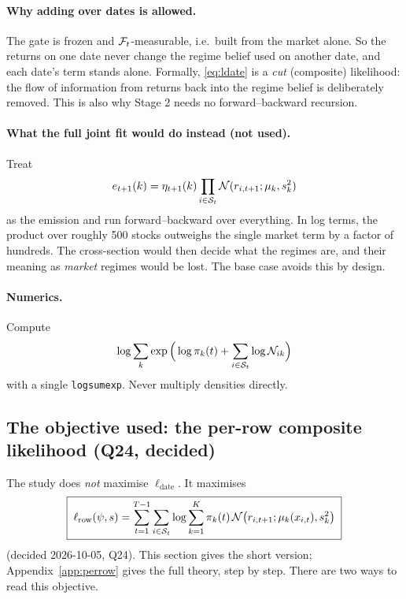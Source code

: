 \paragraph{Why adding over dates is allowed.} The gate is frozen and $\mathcal{F}_t$-measurable, i.e.\ built from the market alone. So the returns on one date never change the regime belief used on another date, and each date's term stands alone. Formally, \eqref{eq:ldate} is a \emph{cut} (composite) likelihood: the flow of information from returns back into the regime belief is deliberately removed. This is also why Stage 2 needs no forward--backward recursion.

\paragraph{What the full joint fit would do instead (not used).} Treat
\begin{equation*}
e_{t+1}(k)=\eta_{t+1}(k)\prod_{i\in\mathcal S_t}\mathcal{N}(r_{i,t+1};\mu_k,s_k^2)
\end{equation*}
as the emission and run forward--backward over everything. In log terms, the product over roughly 500 stocks outweighs the single market term by a factor of hundreds. The cross-section would then decide what the regimes are, and their meaning as \emph{market} regimes would be lost. The base case avoids this by design.

\paragraph{Numerics.} Compute
\[
\log\sum_k\exp\Big(\log\pi_k(t)+\sum_{i\in\mathcal S_t}\log\mathcal{N}_{ik}\Big)
\]
with a single \texttt{logsumexp}. Never multiply densities directly.

\subsection{The objective used: the per-row composite likelihood (Q24, decided)}

The study does \emph{not} maximise $\ell_{\text{date}}$. It maximises
\begin{equation}\label{eq:lrow}
\boxed{\;\ell_{\text{row}}(\psi,s)=\sum_{t=1}^{T-1}\sum_{i\in\mathcal S_t}\log\sum_{k=1}^K\pi_k(t)\,\mathcal{N}\big(r_{i,t+1};\mu_k(x_{i,t}),s_k^2\big)\;}
\end{equation}
(decided 2026-10-05, Q24). This section gives the short version; Appendix~\ref{app:perrow} gives the full theory, step by step. There are two ways to read this objective.

